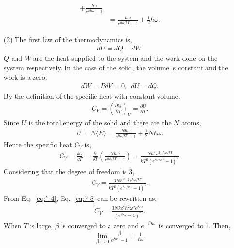 \documentclass[floatfix,nofootinbib,superscriptaddress,fleqn]{revtex4-2}
\begin{document}
\begin{itemize}
\begin{align}
\begin{split}
      +\frac{\hbar\omega}{e^{\beta\hbar\omega}-1} \\
      &=\frac{\hbar\omega}{e^{\hbar\omega/kT}-1} 
      + \frac{1}{2}\hbar\omega.
    \end{split}
  \end{align}
  \item[(2)] The first law of the thermodynamics is,
  \begin{align}
    dU = dQ - dW.
  \end{align} 
  $Q$ and $W$ are the heat supplied to the system and 
  the work done on the system respectively. In the case of
  the solid, the volume is constant and the work is a zero.
  \begin{align}
    dW = PdV = 0,\,\,\, dU = dQ.
  \end{align}
  By the definition of the specific heat with constant volume,
  \begin{align}
    C_V = \left(\frac{\partial Q}{\partial T}\right)_V 
    =\frac{\partial U}{\partial T}.
  \end{align}
  Since $U$ is the total energy of the solid and there are the $N$
  atoms,
  \begin{align}
    U = N\langle E\rangle=\frac{N\hbar\omega}{e^{\hbar\omega/kT}-1} 
    + \frac{1}{2}N\hbar\omega.
  \end{align}
  Hence the specific heat $C_V$ is,
  \begin{align}\label{eq:7-8}
    C_V = \frac{\partial U}{\partial T}
    = \frac{\partial }{\partial T}
    \left(\frac{N\hbar\omega}{e^{\hbar\omega/kT}-1}\right) 
    =\frac{N\hbar^2\omega^2e^{\hbar\omega/kT}}
    {kT^2\left(e^{\hbar\omega/kT}-1\right)^2}.
  \end{align}
  Considering that the degree of freedom is 3,
  \begin{align}\label{eq:7-9}
    C_V = \frac{3N\hbar^2\omega^2e^{\hbar\omega/kT}}
    {kT^2\left(e^{\hbar\omega/kT}-1\right)^2}.
  \end{align}
  From Eq.~\eqref{eq:7-4}, Eq.~\eqref{eq:7-8} can be rewritten as,
  \begin{align}
    C_V=\frac{3Nk\beta^2\hbar^2\omega^2e^{\beta\hbar\omega}}
    {\left(e^{\beta\hbar\omega}-1\right)^2}.
  \end{align}
  When $T$ is large, $\beta$ is converged to a zero and 
  $e^{-\beta\hbar\omega}$ is converged to 1. Then,
  \begin{align}
    \lim_{\beta\rightarrow 0}\frac{\beta}
    {e^{\beta\hbar\omega}-1} = \frac{1}{\hbar\omega}.
  \end{align}

\end{itemize}
\end{document}
